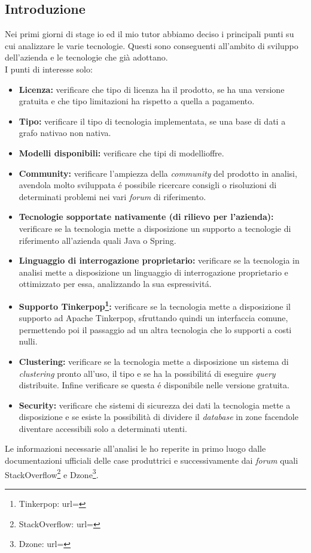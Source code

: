 \subsection{Introduzione}
Nei primi giorni di stage io ed il mio tutor abbiamo deciso i principali punti su cui analizzare le varie tecnologie. Questi sono conseguenti all'ambito di sviluppo dell'azienda e le tecnologie che già adottano.\\
I punti di interesse solo:
\begin{itemize}
\item{\textbf{Licenza:}} verificare che tipo di licenza ha il prodotto, se ha una versione gratuita e che tipo limitazioni ha rispetto a quella a pagamento.
\item{\textbf{Tipo:}} verificare il tipo di tecnologia implementata, se una base di dati a grafo nativa\glsfirstoccur o non nativa\glsfirstoccur.
\item{\textbf{Modelli disponibili:}} verificare che tipi di modelli\glsfirstoccur offre.
\item{\textbf{Community:}} verificare l'ampiezza della \textit{community} del prodotto in analisi, avendola molto sviluppata é possibile ricercare consigli o risoluzioni di determinati problemi nei vari \textit{forum} di riferimento.
\item{\textbf{Tecnologie sopportate nativamente (di rilievo per l'azienda):}} verificare se la tecnologia mette a disposizione un supporto a tecnologie di riferimento all'azienda quali Java o Spring.
\item{\textbf{Linguaggio di interrogazione proprietario:}} verificare se la tecnologia in analisi mette a disposizione un linguaggio di interrogazione proprietario e ottimizzato per essa, analizzando la sua espressivitá.
\item{\textbf{Supporto Tinkerpop\footnote{Tinkerpop: url= }:}} verificare se la tecnologia mette a disposizione il supporto ad Apache Tinkerpop, sfruttando quindi un interfaccia comune, permettendo poi il passaggio ad un altra tecnologia che lo supporti a costi nulli.
\item{\textbf{Clustering\glsfirstoccur:}} verificare se la tecnologia mette a disposizione un sistema di \textit{clustering} pronto all'uso, il tipo e se ha la possibilitá di eseguire \textit{query} distribuite. Infine verificare se questa é disponibile nelle versione gratuita.
\item{\textbf{Security:}} verificare che sistemi di sicurezza dei dati la tecnologia mette a disposizione e se esiste la possibilità di dividere il \textit{database} in zone facendole diventare accessibili solo a determinati utenti.\\

\end{itemize}
Le informazioni necessarie all'analisi le ho reperite in primo luogo dalle documentazioni ufficiali delle case produttrici e successivamente dai \textit{forum} quali StackOverflow\footnote{StackOverflow: url= } e Dzone\footnote{Dzone: url= }.
